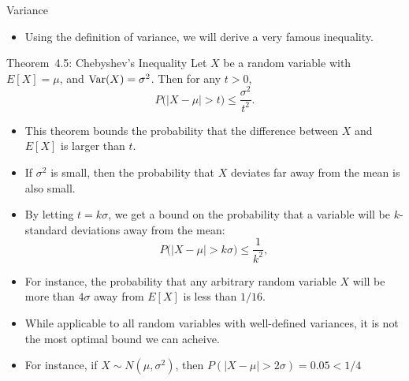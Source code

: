 \begin{frame}[allowframebreaks]{Variance}
  \framebreak
  
  \begin{itemize}
    \item Using the definition of variance, we will derive a very famous inequality.
  \end{itemize}
  
  \begin{block}{Theorem~4.5: Chebyshev's Inequality}
    Let $X$ be a random variable with $E[X] = \mu$, and $\mathrm{Var}(X) = \sigma^2$. Then for any $t > 0$,
    $$
    P\big(|X - \mu| > t\big) \leq \frac{\sigma^2}{t^2}.
    $$
  \end{block}
  
  \framebreak
  
  \begin{itemize}
    \item This theorem bounds the probability that the difference between $X$ and $E[X]$ is larger than $t$.
    \item If $\sigma^2$ is small, then the probability that $X$ deviates far away from the mean is also small.
    \item By letting $t = k\sigma$, we get a bound on the probability that a variable will be $k$-standard deviations away from the mean:
    $$
    P\big(|X - \mu| > k\sigma\big)\leq \frac{1}{k^2},
    $$
    \item For instance, the probability that any arbitrary random variable $X$ will be more than $4\sigma$ away from $E[X]$ is less than $1/16$.
    \item While applicable to all random variables with well-defined variances, it is not the most optimal bound we can acheive.
    \item For instance, if $X \sim N(\mu, \sigma^2)$, then $P(|X - \mu| > 2\sigma) = 0.05 < 1/4$
  \end{itemize}
  

\end{frame}
